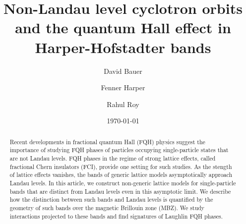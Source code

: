 \documentclass[aps,prb,twocolumn,letterpaper,twoside,nobalancelastpage,groupedaddress,amsmath,amssymb,floatfix,citeautoscript]{revtex4-1}
\begin{document}
\def \Ns {\mathbb{N}}
\def \Rs {\mathbb{R}}
\def \Zs {\mathbb{Z}}
\def \Qs {\mathbb{Q}}
\def \Cs {\mathbb{C}}
\def \id {\mathbb{I}}

\def \bfq {{\bf q}}
\def \bfp {{\bf p}}
\def \bfx {{\bf x}}
\def \bfy {{\bf y}}
\def \bfz {{\bf z}}
\def \bfr {{\bf r}}
\def \bfk {{\bf k}}
\def \bfn {{\bf n}}
\def \bfb {{\bf b}}
\def \bfm {\mathbf{m}}
\def \bfn {\mathbf{n}}


\def \hatq {\widehat{q}}
\def \hatp {\widehat{p}}
\def \hata {\widehat{a}}
\def \hatadag {\widehat{a}^{\dagger}}
\def \wtN {\widetilde{N}}

\def \ve {\varepsilon}
\def \vth {\vartheta}

\title{Non-Landau level cyclotron orbits and the quantum Hall effect in Harper-Hofstadter bands}
\author{David Bauer}

\author{Fenner Harper}

\author{Rahul Roy}

\date{\today}
\begin{abstract}
Recent developments in fractional quantum Hall (FQH) physics suggest the importance of studying FQH phases of particles occupying single-particle states that are not Landau levels. FQH phases in the regime of strong lattice effects, called fractional Chern insulators (FCI), provide one setting for such studies. As the stength of lattice effects vanishes, the bands of generic lattice models asymptotically approach Landau levels. In this article, we construct non-generic lattice models for single-particle bands that are distinct from Landau levels even in this asymptotic limit. We describe how the distinction between such bands and Landau levels is quantified by the geometry of such bands over the magnetic Brillouin zone (MBZ). We study interactions projected to these bands and find signatures of Laughlin FQH phases.
\end{abstract}
\end{document}

